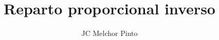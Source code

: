 \documentclass[12pt,addpoints,answers]{guia}
\title{Reparto proporcional inverso}
\author{JC Melchor Pinto}
\begin{document}
\pagestyle{headandfoot}
\INFO%
\begin{questions}
    \questionboxed[25]{}
    \questionboxed[25]{}
    \questionboxed[25]{}
\end{questions}

\end{document}
